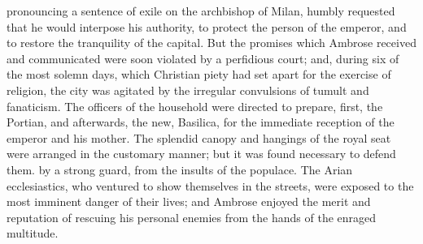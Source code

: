 pronouncing a sentence of exile on the archbishop of Milan,
humbly requested that he would interpose his authority, to
protect the person of the emperor, and to restore the tranquility
of the capital. But the promises which Ambrose received and
communicated were soon violated by a perfidious court; and,
during six of the most solemn days, which Christian piety had set
apart for the exercise of religion, the city was agitated by the
irregular convulsions of tumult and fanaticism. The officers of
the household were directed to prepare, first, the Portian, and
afterwards, the new, Basilica, for the immediate reception of the
emperor and his mother. The splendid canopy and hangings of the
royal seat were arranged in the customary manner; but it was
found necessary to defend them. by a strong guard, from the
insults of the populace. The Arian ecclesiastics, who ventured to
show themselves in the streets, were exposed to the most imminent
danger of their lives; and Ambrose enjoyed the merit and
reputation of rescuing his personal enemies from the hands of the
enraged multitude.


